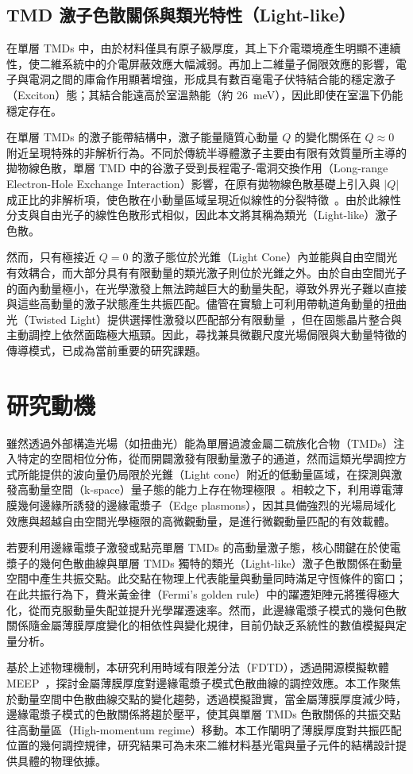 \subsection{TMD 激子色散關係與類光特性（Light-like）}
在單層 TMDs 中，由於材料僅具有原子級厚度，其上下介電環境產生明顯不連續性，使二維系統中的介電屏蔽效應大幅減弱。再加上二維量子侷限效應的影響，電子與電洞之間的庫侖作用顯著增強，形成具有數百毫電子伏特結合能的穩定激子（Exciton）態；其結合能遠高於室溫熱能（約 26~meV），因此即使在室溫下仍能穩定存在。

在單層 TMDs 的激子能帶結構中，激子能量隨質心動量 $Q$ 的變化關係在 $Q \approx 0$ 附近呈現特殊的非解析行為。不同於傳統半導體激子主要由有限有效質量所主導的拋物線色散，單層 TMD 中的谷激子受到長程電子-電洞交換作用（Long-range Electron-Hole Exchange Interaction）影響，在原有拋物線色散基礎上引入與 $|Q|$成正比的非解析項，使色散在小動量區域呈現近似線性的分裂特徵~\cite{qiu2015}。由於此線性分支與自由光子的線性色散形式相似，因此本文將其稱為類光（Light-like）激子色散。

然而，只有極接近 $Q = 0$ 的激子態位於光錐（Light Cone）內並能與自由空間光有效耦合，而大部分具有有限動量的類光激子則位於光錐之外。由於自由空間光子的面內動量極小，在光學激發上無法跨越巨大的動量失配，導致外界光子難以直接與這些高動量的激子狀態產生共振匹配。儘管在實驗上可利用帶軌道角動量的扭曲光（Twisted Light）提供選擇性激發以匹配部分有限動量~\cite{simbulan2021}，但在固態晶片整合與主動調控上依然面臨極大瓶頸。因此，尋找兼具微觀尺度光場侷限與大動量特徵的傳導模式，已成為當前重要的研究課題。
\section{研究動機}
雖然透過外部構造光場（如扭曲光）能為單層過渡金屬二硫族化合物（TMDs）注入特定的空間相位分佈，從而開闢激發有限動量激子的通道，然而這類光學調控方式所能提供的波向量仍局限於光錐（Light cone）附近的低動量區域，在探測與激發高動量空間（k-space）量子態的能力上存在物理極限~\cite{simbulan2021}。相較之下，利用導電薄膜幾何邊緣所誘發的邊緣電漿子（Edge plasmons），因其具備強烈的光場局域化效應與超越自由空間光學極限的高微觀動量，是進行微觀動量匹配的有效載體。

若要利用邊緣電漿子激發或點亮單層 TMDs 的高動量激子態，核心關鍵在於使電漿子的幾何色散曲線與單層 TMDs 獨特的類光（Light-like）激子色散關係在動量空間中產生共振交點。此交點在物理上代表能量與動量同時滿足守恆條件的窗口；在此共振行為下，費米黃金律（Fermi's golden rule）中的躍遷矩陣元將獲得極大化，從而克服動量失配並提升光學躍遷速率。然而，此邊緣電漿子模式的幾何色散關係隨金屬薄膜厚度變化的相依性與變化規律，目前仍缺乏系統性的數值模擬與定量分析。

基於上述物理機制，本研究利用時域有限差分法（FDTD），透過開源模擬軟體 MEEP~\cite{oskooi2010meep}，探討金屬薄膜厚度對邊緣電漿子模式色散曲線的調控效應。本工作聚焦於動量空間中色散曲線交點的變化趨勢，透過模擬證實，當金屬薄膜厚度減少時，邊緣電漿子模式的色散關係將趨於壓平，使其與單層 TMDs 色散關係的共振交點往高動量區（High-momentum regime）移動。本工作闡明了薄膜厚度對共振匹配位置的幾何調控規律，研究結果可為未來二維材料基光電與量子元件的結構設計提供具體的物理依據。